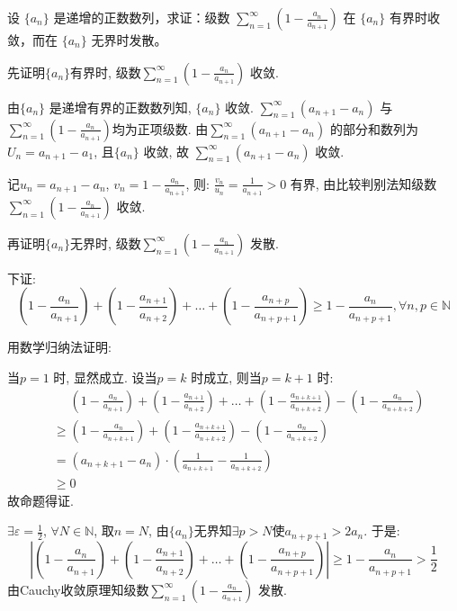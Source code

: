 \setcounter{problems}{4}
\begin{problem}
    设 \(\{a_n\}\) 是递增的正数数列，求证：级数 \(\sum_{n=1}^{\infty} \left(1 -
    \frac{a_n}{a_{n+1}}\right)\) 在 \(\{a_n\}\) 有界时收敛，而在
    \(\{a_n\}\) 无界时发散。
\end{problem}

\begin{solution}
    先证明\(\{a_{n}\}\)有界时,  级数\(\sum_{n=1}^{\infty} \left(1 -
    \frac{a_n}{a_{n+1}}\right)\) 收敛.

    由\(\{a_{n}\}\) 是递增有界的正数数列知, \(\{a_{n}\}\) 收敛.
    \(\sum_{n=1}^{\infty} (a_{n+1} - a_{n})\)
    与\(\sum_{n=1}^{\infty} \left(1 -
    \frac{a_n}{a_{n+1}}\right)\)均为正项级数. 由\(\sum_{n=1}^{\infty}
    (a_{n+1} - a_{n})\) 的部分和数列为\(U_{n} = a_{n+1} - a_{1}\),
    且\(\{a_{n}\}\) 收敛, 故 \(\sum_{n=1}^{\infty} (a_{n+1} - a_{n})\) 收敛.

    记\(u_{n} = a_{n+1} - a_{n}\), \(v_{n} = 1 -
    \frac{a_{n}}{a_{n+1}}\), 则: \(\frac{v_{n}}{u_{n}} =
    \frac{1}{a_{n+1}} > 0\) 有界,
    由比较判别法知级数\(\sum_{n=1}^{\infty} \left(1 -
    \frac{a_n}{a_{n+1}}\right)\) 收敛.

    再证明\(\{a_{n}\}\)无界时, 级数\(\sum_{n=1}^{\infty} \left(1 -
    \frac{a_n}{a_{n+1}}\right)\) 发散.

    下证: \[
        \left(1 - \frac{a_{n}}{a_{n+1}}\right) + \left(1 -
        \frac{a_{n+1}}{a_{n+2}}\right) + \dots +
        \left(1 - \frac{a_{n+p}}{a_{n+p+1}}\right) \geq 1 -
        \frac{a_{n}}{a_{n+p+1}}, \forall n, p \in \mathbb{N}
    \]

    用数学归纳法证明:

    当\(p = 1\) 时, 显然成立.
    设当\(p = k\) 时成立, 则当\(p = k+1\) 时:
    \begin{align*}
        &\mathrel{\phantom{=}} \left(1 - \frac{a_{n}}{a_{n+1}}\right)
        + \left(1 - \frac{a_{n+1}}{a_{n+2}}\right) + \dots + \left(1 -
        \frac{a_{n+k+1}}{a_{n+k+2}}\right) - \left(1 -
        \frac{a_{n}}{a_{n+k+2}}\right)\\
        & \geq \left(1 - \frac{a_{n}}{a_{n+k+1}}\right) + \left(1 -
        \frac{a_{n+k+1}}{a_{n+k+2}}\right) - \left(1 -
        \frac{a_{n}}{a_{n+k+2}}\right)\\
        &= \left(a_{n+k+1} - a_{n}\right) \cdot \left(
            \frac{1}{a_{n+k+1}} -
        \frac{1}{a_{n+k+2}} \right)\\
        & \geq 0
    \end{align*}
    故命题得证.

    \(\exists \varepsilon = \frac{1}{2}\), \(\forall N \in
    \mathbb{N}\), 取\(n = N\), 由\(\{a_{n}\}\)无界知\(\exists p >
    N\)使\(a_{n+p+1} > 2a_{n}\). 于是:
    \[
        \left| \left( 1 - \frac{a_{n}}{a_{n+1}} \right) + \left( 1 -
        \frac{a_{n+1}}{a_{n+2}} \right) + \dots + \left( 1 -
        \frac{a_{n+p}}{a_{n+p+1}} \right)  \right| \geq 1 -
        \frac{a_{n}}{a_{n+p+1}} > \frac{1}{2}
    \]
    由Cauchy收敛原理知级数\(\sum_{n=1}^{\infty} \left(1 -
    \frac{a_n}{a_{n+1}}\right)\) 发散.
\end{solution}

